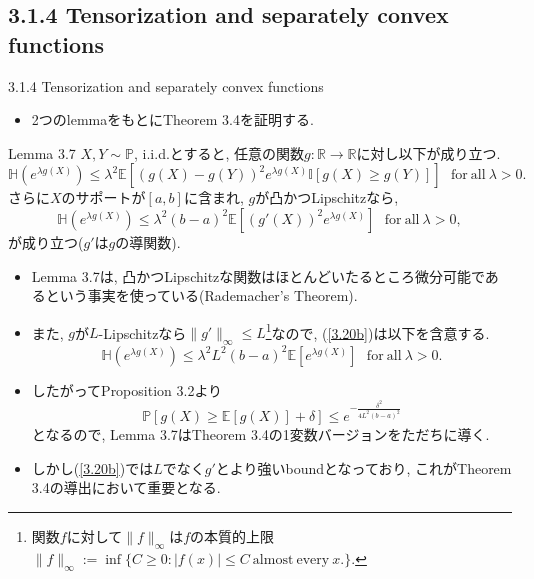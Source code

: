 \documentclass[aspectratio=169, dvipdfmx]{beamer}
\newcommand{\ex}{\mathbb{E}}
\begin{document}
\subsection{3.1.4 Tensorization and separately convex functions}
\begin{frame}{3.1.4 Tensorization and separately convex functions}
\begin{itemize}
    \item 2つのlemmaをもとにTheorem 3.4を証明する.
\end{itemize}
\begin{block}{Lemma 3.7}
    $X, Y \sim \mathbb{P}$, i.i.d.とすると, 任意の関数$g:\mathbb{R}\to\mathbb{R}$に対し以下が成り立つ.
    \[
        \mathbb{H}(e^{\lambda g(X)})
        \le \lambda^2\ex\left[(g(X)-g(Y))^2e^{\lambda g(X)}\mathbb{I}[g(X)\ge g(Y)]\right]
        \ \ \ \mathrm{for\ all}\ \lambda > 0.
        \tag{3.20a}\label{3.20a}
    \]
    さらに$X$のサポートが$[a,b]$に含まれ, $g$が凸かつLipschitzなら,
    \[
        \mathbb{H}(e^{\lambda g(X)})
        \le \lambda^2(b-a)^2\ex\left[(g'(X))^2e^{\lambda g(X)}\right]
        \ \ \ \mathrm{for\ all}\ \lambda>0,
        \tag{3.20b}\label{3.20b}
    \]
    が成り立つ($g'$は$g$の導関数).
\end{block}
\end{frame}

\begin{frame}{}
\begin{itemize}
    \item Lemma 3.7は, 凸かつLipschitzな関数はほとんどいたるところ微分可能であるという事実を使っている(Rademacher's Theorem).
    \item また, $g$が$L$-Lipschitzなら$\|g'\|_\infty \le L$\footnote{関数$f$に対して$\|f\|_\infty$は$f$の本質的上限$\|f\|_\infty:=\inf\{C\ge 0: |f(x)| \le C \mathrm{\ almost\ every}\ x.\}$.}なので,
          (\ref{3.20b})は以下を含意する.
          \[
              \mathbb{H}(e^{\lambda  g(X)}) \le \lambda^2 L^2(b-a)^2\ex[e^{\lambda g(X)}]
              \ \ \ \mathrm{for\ all}\ \lambda > 0.
          \] 
    \item したがってProposition 3.2より
    \[ \mathbb{P}[g(X) \ge \ex[g(X)]+\delta] \le e^{-\frac{\delta^2}{4L^2(b-a)^2}} \]
    となるので, Lemma 3.7はTheorem 3.4の1変数バージョンをただちに導く.
    \item しかし(\ref{3.20b})では$L$でなく$g'$とより強いboundとなっており,
    これがTheorem 3.4の導出において重要となる.
\end{itemize}
\end{frame}
\end{document}
